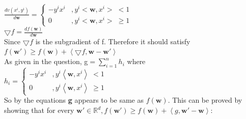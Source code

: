 \documentclass[a4paper,11pt]{article}
\begin{document}
\begin{mlsolution}
\begin{math}
\frac{dv\left ( x^{i}, y^{i} \right )}{d\textbf{w}} = \left\{\begin{matrix}
-y^{i}x^{i} &,  y^{i}<\textbf{w}, x^{i}> \;<  1\\ 
0 & , y^{i}<\textbf{w}, x^{i}> \;\geq  1
\end{matrix}\right.
\end{math}\\

\begin{math}
\bigtriangledown f = \frac{df\left ( \textbf{w} \right )}{d\textbf{w}}
\end{math}\\

Since \begin{math}\bigtriangledown f\end{math} is the subgradient of f. Therefore it should satisfy \\

\begin{math}
f\left ( \textbf{w}{}' \right ) \geq f\left ( \textbf{w}{} \right ) + \left \langle \bigtriangledown f, \textbf{w} - \textbf{w}{}' \right \rangle
\end{math}\\

As given in the question, 
g\begin{math} = \sum_{i=1}^{n}h_{i} \end{math} where  \\

\begin{math}
h_{i} = \left\{
\begin{matrix}
-y^{i}x^{i} &,  y^{i} \left \langle \textbf{w}, x^{i} \right \rangle \;<  1\\ 
0 & , y^{i} \left \langle \textbf{w}, x^{i} \right \rangle \;\geq  1
\end{matrix}\right.
\end{math}\\

So by the equations \textbf{g} appears to be same as \begin{math}f\left ( \textbf{w} \right ).\end{math} This can be proved by showing that for every \begin{math}\textbf{w}{}' \in \mathbb{R}^{d}, f\left ( \textbf{w}{}' \right ) \geq f\left ( \textbf{w} \right ) + \left \langle g, \textbf{w}{}' - \textbf{w} \right \rangle:\end{math}\\


\end{mlsolution}
\end{document}
